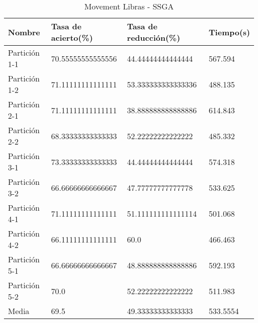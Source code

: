 \begin{table}[H]
	\centering
	\begin{tabular}{l|lll}
		Nombre        & Tasa de acierto(\%) & Tasa de reducción(\%) & Tiempo(s) \\ \hline
		Partición 1-1 & 70.55555555555556   & 44.44444444444444     & 567.594   \\
		Partición 1-2 & 71.11111111111111   & 53.333333333333336    & 488.135   \\
		Partición 2-1 & 71.11111111111111   & 38.888888888888886    & 614.843   \\
		Partición 2-2 & 68.33333333333333   & 52.22222222222222     & 485.332   \\
		Partición 3-1 & 73.33333333333333   & 44.44444444444444     & 574.318   \\
		Partición 3-2 & 66.66666666666667   & 47.77777777777778     & 533.625   \\
		Partición 4-1 & 71.11111111111111   & 51.111111111111114    & 501.068   \\
		Partición 4-2 & 66.11111111111111   & 60.0                  & 466.463   \\
		Partición 5-1 & 66.66666666666667   & 48.888888888888886    & 592.193   \\
		Partición 5-2 & 70.0                & 52.22222222222222     & 511.983   \\ \hline
		Media         & 69.5                & 49.33333333333333     & 533.5554
	\end{tabular}
	\caption{Movement Libras - SSGA}
	\label{MLIB-SSGA}
\end{table}